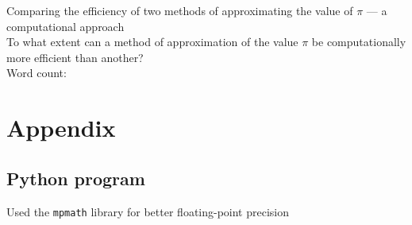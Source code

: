 \documentclass[12pt,a4paper]{article}
\begin{document}
\doublespacing %


\begin{titlepage}
    \begin{center}
    \vspace*{4cm}
        Comparing the efficiency of two methods of approximating the value of $\pi$ ---
        a computational approach\\
    \vspace{1cm}
    To what extent can a method of approximation of the value $\pi$ be computationally more efficient than another? \\
    \vspace{4cm}
    Word count: 
    \vfill
    \vspace{0.1cm}
    \end{center}
    \end{titlepage}



\begin{center}
\tableofcontents
\vspace{1in}

\end{center}




\newpage











\printbibliography[heading=bibintoc, title=Works Cited]

\appendix
\section{Appendix}
\label{app}
\subsection{Python program}
\label{app:scripts}
Used the \verb|mpmath| library for better floating-point precision \cite{mpmath}

\end{document}
